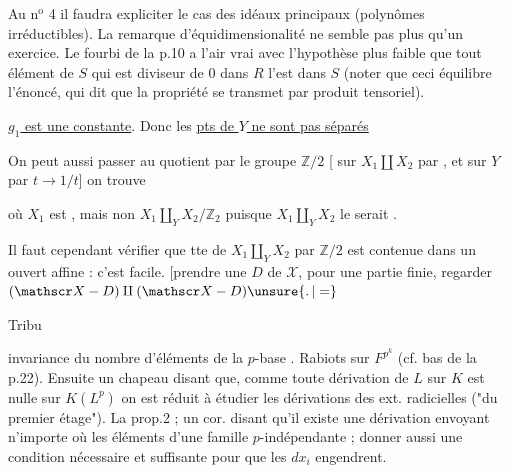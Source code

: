 Au n$^{\mathrm{o}}$ 4 il faudra expliciter le cas des idéaux principaux (polynômes irréductibles). La remarque d'équidimensionalité ne semble pas plus qu'un exercice. Le fourbi de la p.10 a l'air vrai avec l'hypothèse plus faible que tout élément de $S$ qui est diviseur de $0$ dans $R$ l'est dans $S$ (noter que ceci équilibre l'énoncé, qui dit que la propriété se transmet par produit tensoriel).


  \uline{$g_1$ est une constante}. Donc les \uline{pts de $Y$ ne sont pas séparés}

On peut aussi passer au quotient par le groupe $\mathbb Z/2$ [ sur $X_1\amalg X_2$ par , et sur $Y$ par $t\to1/t$] on trouve



où $X_1$ est ,  mais non $X_1\amalg_Y X_2/\mathbb Z_2$ puisque $X_1\amalg_Y X_2$ le serait .

Il faut cependant vérifier que tte   de $X_1\amalg_Y X_2$ par $\mathbb Z/2$ est contenue dans un ouvert affine : c'est facile. [prendre une  $D$ de $\mathscr X$,   pour une partie finie, regarder $(\mathscr X-D)\amalg(\mathscr X-D)\unsure{\mathpunct{.}|=}$



Tribu 

invariance du nombre d'éléments de la $p$-base . Rabiots sur $F^{p^k}$ (cf. bas de la p.22). Ensuite un chapeau disant que, comme toute dérivation de $L$ sur $K$ est nulle sur $K(L^p)$ on est réduit à étudier les dérivations des ext. radicielles ("du premier étage"). La prop.2 ; un cor. disant qu'il existe une dérivation envoyant n'importe où les éléments d'une famille $p$-indépendante ; donner aussi une condition nécessaire et suffisante pour que les $dx_i$ engendrent.

